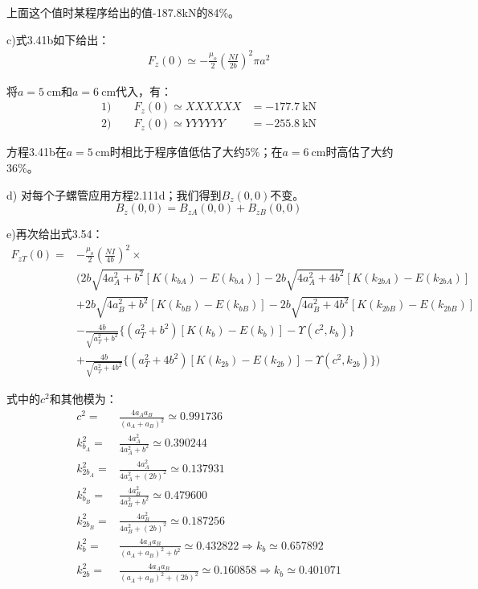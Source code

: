 上面这个值时某程序给出的值-187.8kN的84\%。

c)式3.41b如下给出：
\begin{align*}
F_{z}(0)\simeq-\frac{\mu_{o}}{2}(\frac{NI}{2b})^{2}\pi a^{2}\tag{3.41b}%
\end{align*}

将$a=5\ \mathrm{cm}$和$a=6\ \mathrm{cm}$代入，有：
\begin{align*}
1)\qquad F_z(0)\simeq XXXXXX &=-177.7\ \mathrm{kN}\\
2)\qquad F_z(0)\simeq YYYYYY &= -255.8\ \mathrm{kN}
\end{align*}

方程3.41b在$a=5\ \mathrm{cm}$时相比于程序值低估了大约5\%；在$a=6 \ \mathrm{cm}$时高估了大约36\%。

d) 对每个子螺管应用方程2.111d；我们得到$B_z(0,0)$不变。
$$B_z(0,0) = B_{zA}(0,0) + B_{zB}(0,0)$$

e)再次给出式3.54：
\begin{align*}
F_{zT}(0)=&-\frac{\mu_{o}}{2}(\frac{NI}{4b})^{2}\times\\
&(2b\sqrt{4a_{A}^{2}+b^{2}}[K(k_{bA})-E(k_{bA})]-2b\sqrt{4a_{A}^{2}+4b^{2}}[K(k_{2bA})-E(k_{2bA})]\\
&+2b\sqrt{4a_{B}^{2}+b^{2}}[K(k_{bB})-E(k_{bB})]-2b\sqrt{4a_{B}^{2}+4b^{2}}[K(k_{2bB})-E(k_{2bB})]\\
&-\frac{4b}{\sqrt{a_{T}^{2}+b^{2}}}\{(a_{T}^{2}+b^{2})[K(k_{b})-E(k_{b})]-\Upsilon(c^{2},k_{b})\}\\
&+\frac{4b}{\sqrt{a_{T}^{2}+4b^{2}}}\{(a_{T}^{2}+4b^{2})[K(k_{2b})-E(k_{2b})]-\Upsilon(c^{2},k_{2b})\})\tag{3.54}
\end{align*}

式中的$c^2$和其他模为：
\begin{align*}
c^2=&\frac{4a_A a_B}{(a_A+a_B)^2}\simeq 0.991736\\
k_{b_A}^2=&\frac{4a_A^2}{4a_A^2+b^2}\simeq 0.390244\\
k_{2b_A}^2=&\frac{4a_A^2}{4a_A^2+(2b)^2}\simeq 0.137931\\
k_{b_B}^2=&\frac{4a_B^2}{4a_B^2+b^2}\simeq 0.479600\\
k_{2b_B}^2=&\frac{4a_B^2}{4a_B^2+(2b)^2}\simeq 0.187256\\
k_{b}^2=&\frac{4a_A a_B}{(a_A+a_B)^2+b^2}\simeq 0.432822\Rightarrow k_b\simeq 0.657892\\
k_{2b}^2=&\frac{4a_A a_B}{(a_A+a_B)^2+(2b)^2}\simeq 0.160858\Rightarrow k_b\simeq 0.401071 
\end{align*}

